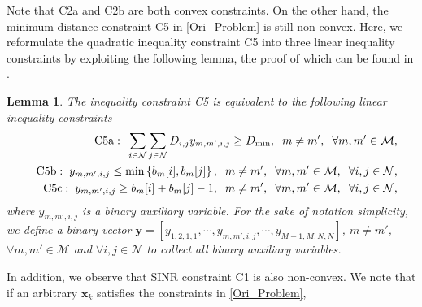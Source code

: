 \documentclass[12pt, draftclsnofoot, onecolumn]{IEEEtran}
\newtheorem{lemma}{Lemma}
\begin{document}
Note that C2a and ${\mbox{C2b}}$ are both convex constraints. On the other hand, the minimum distance constraint C5 in \eqref{Ori_Problem} is still non-convex. Here, we reformulate the quadratic inequality constraint C5 into three linear inequality constraints by exploiting the following lemma, the proof of which can be found in \cite{glover1974converting}.
\begin{lemma}
    The inequality constraint C5 is equivalent to the following linear inequality constraints%
\begin{eqnarray}
    &&\mathrm{C5a:}\hspace*{2mm}\sum_{i\in\mathcal{N}}\sum_{j\in\mathcal{N}}D_{i,j}y_{m,m',i,j}\geq D_{\mathrm{min}},\hspace*{2mm}m\neq m',\hspace*{2mm}\forall m,m'\in\mathcal{M},\notag\\
    &&\mathrm{C5b:}\hspace*{2mm}y_{m,m',i,j}\leq \min\left\{b_m[i],b_m[j]\right\},\hspace*{2mm}m\neq m',\hspace*{2mm} \forall m,m'\in\mathcal{M},\hspace*{2mm}\forall i,j\in\mathcal{N},\\
    &&\mathrm{C5c:}\hspace*{2mm}y_{m,m',i,j}\geq b_m[i]+b_m[j]-1,\hspace*{2mm}m\neq m',\hspace*{2mm} \forall m,m'\in\mathcal{M},\hspace*{2mm}\forall i,j\in\mathcal{N}\notag,
\end{eqnarray}
where $y_{m,m',i,j}$ is a binary auxiliary variable. For the sake of notation simplicity, we define a binary vector $\mathbf{y}=[y_{1,2,1,1},\cdots,y_{m,m',i,j},\cdots,y_{M-1,M,N,N}]$, $m\neq m'$, $\forall m,m'\in\mathcal{M}$ and $\forall i,j\in\mathcal{N}$ to collect all binary auxiliary variables.
\end{lemma}
\par
In addition, we observe that SINR constraint C1 is also non-convex. We note that if an arbitrary $\mathbf{x}_k$ satisfies the constraints in \eqref{Ori_Problem}, %
\end{document}
